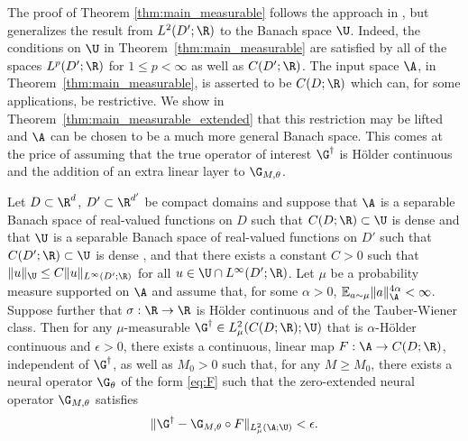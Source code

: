 The proof of Theorem \ref{thm:main_measurable} follows the approach in \cite{lanthaler2021error}, but generalizes the result from \(L^2(D';\R)\) to the Banach space \(\U\). Indeed, the conditions on \(\U\) in Theorem~\ref{thm:main_measurable} are satisfied by all of the spaces \(L^p(D';\R)\) for \(1 \leq p < \infty\) as well as \(C(D';\R)\). The input space \(\A\), in Theorem~\ref{thm:main_measurable}, is asserted to be \(C(D;\R)\) which can, for some applications, be restrictive. We show in Theorem~\ref{thm:main_measurable_extended} that this restriction may be lifted and \(\A\) can be chosen to be a much more general Banach space. This comes at the price of assuming that the true operator of interest \(\G^\dagger\) is H{\"o}lder continuous and the addition of an extra linear layer to \(\G_{M,\theta}\).

\begin{theorem}
\label{thm:main_measurable_extended}
Let \(D \subset \R^d\), \(D' \subset \R^{d'}\) be compact domains and suppose that \(\A\) is a separable Banach space of real-valued functions on \(D\) such that \(C(D;\R) \subset \U\) 
is dense and that \(\U\) is a separable Banach space of real-valued functions on \(D'\) such that \(C(D';\R) \subset \U\) is dense , and that there exists a constant \(C > 0\) such that \(\|u\|_{\U} \leq C \|u\|_{L^\infty (D';\R)}\) for all \(u \in \U \cap L^\infty(D';\R)\). Let \(\mu\) be a probability measure supported on \(\A\) and assume that, for some \(\alpha > 0\), \(\mathbb{E}_{a \sim \mu} \|a\|_{\A}^{4\alpha} < \infty \). Suppose further that \(\sigma : \R \to \R\) is  H{\"o}lder continuous and of the Tauber-Wiener class. Then for any \(\mu\)-measurable \(\G^\dagger \in L^2_\mu(C(D;\R); \U)\) that is \(\alpha\)-H{\"o}lder continuous and \(\epsilon > 0\), there exists a continuous, linear map \(F : \A \to C(D;\R)\), independent of \(\G^\dagger\), as well as \(M_0 > 0\) such that, for any \(M \geq M_0\),
there exists a neural operator \(\G_{\theta}\) of the form \eqref{eq:F} such that the zero-extended neural operator \(\G_{M,\theta}\) satisfies
\[\|\G^\dagger - \G_{M,\theta} \circ F \|_{L^2_\mu (\A;\U)} < \epsilon.\]
\end{theorem}


